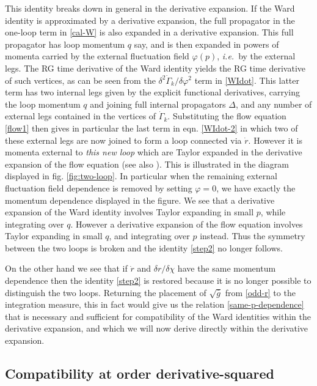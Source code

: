 \documentclass[11pt]{book} %
\newcommand\ie{\textit{i.e.}\ }
\numberwithin{equation}{chapter}
\begin{document}
This identity breaks down in general in the derivative expansion.
If the Ward identity is approximated by a derivative expansion,
the full propagator in the one-loop term in \eqref{cal-W} is also expanded in a derivative expansion.
This full propagator has loop momentum $q$ say,
and is then expanded in powers of momenta carried by the external fluctuation
field $\varphi(p)$, \ie by the external legs.
The RG time derivative of the Ward identity yields the RG time derivative of such vertices,
as can be seen from the $\delta^2\dot{\Gamma}_k/\delta\varphi^2$ term  in \eqref{WIdot}.
This latter term has two internal legs given by the explicit functional derivatives,
carrying the loop momentum $q$ and joining full internal propagators $\Delta$,
and any number of external legs contained in the vertices of $\dot{\Gamma}_k$.
Substituting the flow equation \eqref{flow1} then gives in particular the last term in
eqn. \eqref{WIdot-2} in which two of these external legs are now joined to form a loop
connected via $\dot{r}$.  However it is momenta external to \emph{this new loop} which are
Taylor expanded in the derivative expansion of the flow equation
(see also \cite{Morris:1999ba, Morris:2000hm}).
This is illustrated in the diagram displayed in fig. \ref{fig:two-loop}.
In particular when the remaining external fluctuation field dependence is removed by setting $\varphi=0$,
we have exactly the momentum dependence displayed in the figure.
We see that a derivative expansion of the Ward identity involves Taylor expanding in small $p$,
while integrating over $q$.
However a derivative expansion of the flow equation involves Taylor expanding in small $q$,
and integrating over $p$ instead.
Thus the symmetry between the two loops is broken and the identity \eqref{step2} no longer follows.

On the other hand we see that if $\dot{r}$ and $\delta r/\delta\chi$ have the same momentum
dependence then the identity \eqref{step2} is restored because it is no longer possible
to distinguish the two loops.
Returning the placement of $\sqrt{\bar{g}}$ from \eqref{odd-r} to the integration measure,
this in fact would give us the relation \eqref{same-p-dependence} that is necessary and
sufficient for compatibility of the Ward identities within the derivative expansion,
and which we will now derive directly within the derivative expansion.


\subsection{Compatibility at order derivative-squared}\label{sec:compatibility-at-d2}
\end{document}
